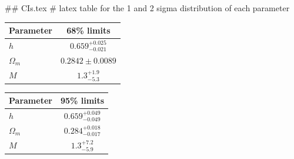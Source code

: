 ## CIs.tex
# latex table for the 1 and 2 sigma distribution of each parameter

\begin{tabular} { l  c}
 Parameter &  68\% limits\\
\hline
{\boldmath$h              $} & $0.659^{+0.025}_{-0.021}   $\\
{\boldmath$\Omega_m       $} & $0.2842\pm 0.0089          $\\
{\boldmath$M              $} & $1.3^{+1.9}_{-5.3}         $\\
\hline
\end{tabular}

\begin{tabular} { l  c}
 Parameter &  95\% limits\\
\hline
{\boldmath$h              $} & $0.659^{+0.049}_{-0.049}   $\\
{\boldmath$\Omega_m       $} & $0.284^{+0.018}_{-0.017}   $\\
{\boldmath$M              $} & $1.3^{+7.2}_{-5.9}         $\\
\hline
\end{tabular}
